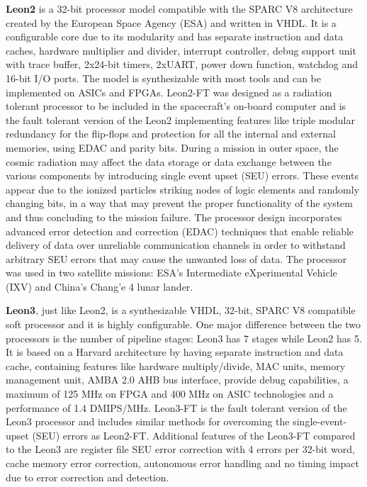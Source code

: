 \hspace{0.5cm} \textbf{Leon2} is a 32-bit processor model compatible with the SPARC V8 architecture created by the European Space Agency (ESA) and written in VHDL. It is a configurable core due to
its modularity and has separate instruction and data caches, hardware multiplier and divider,
interrupt controller, debug support unit with trace buffer, 2x24-bit timers, 2xUART, power
down function, watchdog and 16-bit I/O ports. The model is synthesizable with most tools
and can be implemented on ASICs and FPGAs.
Leon2-FT was designed as a radiation tolerant processor to be included in the spacecraft’s
on-board computer and is the fault tolerant version of the Leon2 implementing features like triple modular redundancy for the flip-flops and protection for all the internal and external
memories, using EDAC and parity bits. During a mission in outer space, the cosmic radiation
may affect the data storage or data exchange between the various components by introducing
single event upset (SEU) errors. These events appear due to the ionized particles striking
nodes of logic elements and randomly changing bits, in a way that may prevent the proper
functionality of the system and thus concluding to the mission failure. The processor design
incorporates advanced error detection and correction (EDAC) techniques that enable reliable
delivery of data over unreliable communication channels in order to withstand arbitrary SEU
errors that may cause the unwanted loss of data. The processor was used in two satellite
missions: ESA’s Intermediate eXperimental Vehicle (IXV) and China’s Chang’e 4 lunar
lander. \cite{8}\cite{9}

\hspace{0.5cm} \textbf{Leon3}, just like Leon2, is a synthesizable VHDL, 32-bit, SPARC V8 compatible soft
processor and it is highly configurable. One major difference between the two processors is
the number of pipeline stages: Leon3 has 7 stages while Leon2 has 5. It is based on a Harvard
architecture by having separate instruction and data cache, containing features like hardware
multiply/divide, MAC units, memory management unit, AMBA 2.0 AHB bus interface,
provide debug capabilities, a maximum of 125 MHz on FPGA and 400 MHz on ASIC
technologies and a performance of 1.4 DMIPS/MHz. Leon3-FT is the fault tolerant version of
the Leon3 processor and includes similar methods for overcoming the single-event-upset
(SEU) errors as Leon2-FT. Additional features of the Leon3-FT compared to the Leon3 are
register file SEU error correction with 4 errors per 32-bit word, cache memory error
correction, autonomous error handling and no timing impact due to error correction and
detection. \cite{9}\cite{10}

